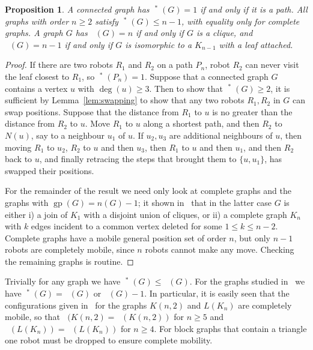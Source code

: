 \documentclass[a4paper,12pt]{article}
\DeclareMathOperator{\mob}{Mob_{gp}}
\DeclareMathOperator{\cmob}{Mob^*_{gp}}
\DeclareMathOperator{\gp}{gp}
\newtheorem{proposition}[theorem]{Proposition}
\theoremstyle{definition}
\begin{document}
	\begin{proposition}\label{prop:comp mob small values}
		A connected graph has $\mob ^*(G) = 1$ if and only if it is a path. All graphs with order $n \geq 2$ satisfy $\mob ^*(G) \leq n-1$, with equality only for complete graphs. A graph $G$ has $\mob (G) = n$ if and only if $G$ is a clique, and $\mob (G) = n-1$ if and only if $G$ is isomorphic to a $K_{n-1}$ with a leaf attached.
	\end{proposition}
	\begin{proof}
		If there are two robots $R_1$ and $R_2$ on a path $P_n$, robot $R_2$ can never visit the leaf closest to $R_1$, so $\mob ^* (P_n) = 1$. Suppose that a connected graph $G$ contains a vertex $u$ with $\deg (u) \geq 3$. Then to show that $\mob ^*(G) \geq 2$, it is sufficient by Lemma~\ref{lem:swapping} to show that any two robots $R_1,R_2$ in $G$ can swap positions. Suppose that the distance from $R_1$ to $u$ is no greater than the distance from $R_2$ to $u$. Move $R_1$ to $u$ along a shortest path, and then $R_2$ to $N(u)$, say to a neighbour $u_1$ of $u$. If $u_2,u_3$ are additional neighbours of $u$, then moving $R_1$ to $u_2$, $R_2$ to $u$ and then $u_3$, then $R_1$ to $u$ and then $u_1$, and then $R_2$ back to $u$, and finally retracing the steps that brought them to $\{ u,u_1\} $, has swapped their positions.
		
		For the remainder of the result we need only look at complete graphs and the graphs with $\gp (G) = n(G)-1$; it shown in~\cite{ullas-2016} that in the latter case $G$ is either i) a join of $K_1$ with a disjoint union of cliques, or ii) a complete graph $K_n$ with $k$ edges incident to a common vertex deleted for some $1 \leq k \leq n-2$. Complete graphs have a mobile general position set of order $n$, but only $n-1$ robots are completely mobile, since $n$ robots cannot make any move. Checking the remaining graphs is routine. 
	\end{proof}
	
	Trivially for any graph we have $\mob ^*(G) \leq \mob (G)$. For the graphs studied in~\cite{klavzar-2023} we have $\mob ^*(G) = \mob (G)$ or $\mob (G) -1$. In particular, it is easily seen that the configurations given in~\cite{klavzar-2023} for the graphs $K(n,2)$ and $L(K_n)$ are completely mobile, so that $\cmob (K(n,2) = \mob (K(n,2))$ for $n \geq 5$ and $\cmob (L(K_n)) = \mob (L(K_n))$ for $n \geq 4$. For block graphs that contain a triangle one robot must be dropped to ensure complete mobility.
	
\end{document}
